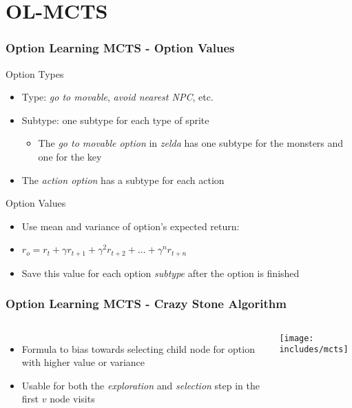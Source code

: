 \documentclass[aspectratio=169]{beamer}
\begin{document}
\section{OL-MCTS}
\begin{frame}
	\frametitle{Option Learning MCTS - Option Values}
	\begin{block}{Option Types}
		\begin{itemize}
			\item Type: \emph{go to movable}, \emph{avoid nearest NPC}, etc.
			\item Subtype: one subtype for each type of sprite
				\begin{itemize}
					\item The \emph{go to movable option} in \textit{zelda} has
						one subtype for the monsters and one for the key
				\end{itemize}
			\item The \emph{action option} has a subtype for each action
		\end{itemize}
	\end{block}
	\begin{block}{Option Values}
		\begin{itemize}
			\item Use mean and variance of option's expected return:
			\item $r_o = r_{t} + \gamma r_{t+1} + \gamma^2 r_{t+2} + \ldots + \gamma^n r_{t+n}$
			\item Save this value for each option \emph{subtype} after the option is finished
		\end{itemize}
	\end{block}
\end{frame}
\begin{frame}
	\frametitle{Option Learning MCTS - Crazy Stone Algorithm \cite{coulom2007efficient}}
	\begin{columns}
			\begin{itemize}
				\item Formula to bias towards selecting child node for option
					with higher value or variance
				\item Usable for both the \emph{exploration} and
					\emph{selection} step in the first $v$ node visits
			\end{itemize}
			\centering
			\texttt{[image: includes/mcts]}
	\end{columns}
\end{frame}
\end{document}
